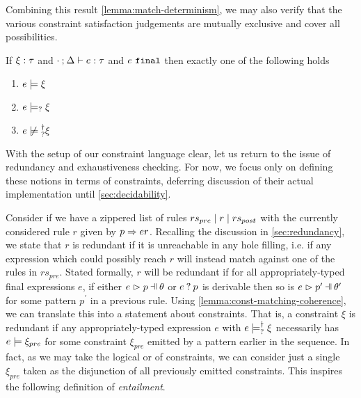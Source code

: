Combining this result \autoref{lemma:match-determinism}, we may also verify that the various constraint satisfaction judgements are mutually exclusive and cover all possibilities.

\begin{theorem}
	\label{theorem:exclusive-constraint-satisfaction}
	If $\xi : \tau$ and $\cdot \mathbin{;} \Delta \vdash e : \tau$ and $e ~\mathtt{final}$ then exactly one of the following holds
	\begin{enumerate}
		\item $e \models \xi$
		\item $e \models_{?} \xi$
		\item $\cnotsatisfyormay{e}{\xi}$
	\end{enumerate}
\end{theorem}

With the setup of our constraint language clear, let us return to the issue of redundancy and exhaustiveness checking. For now, we focus only on defining these notions in terms of constraints, deferring discussion of their actual implementation until \autoref{sec:decidability}.

Consider if we have a zippered list of rules $rs_{pre} \mid r \mid rs_{post}$ with the currently considered rule $r$ given by $p \Rightarrow er$. Recalling the discussion in \autoref{sec:redundancy}, we state that $r$ is redundant if it is unreachable in any hole filling, i.e. if any expression which could possibly reach $r$ will instead match against one of the rules in $rs_{pre}$. Stated formally, $r$ will be redundant if for all appropriately-typed final expressions $e$, if either $\hpatmatch{e}{p}{\theta}$ or $e \mathbin{?} p$ is derivable then so is $\hpatmatch{e}{p^\prime}{\theta^\prime}$ for some pattern $p^\prime$ in a previous rule. Using \autoref{lemma:const-matching-coherence}, we can translate this into a statement about constraints. That is, a constraint $\xi$ is redundant if any appropriately-typed expression $e$ with $e \models_{?}^{\dag} \xi$ necessarily has $e \models \xi_{pre}$ for some constraint $\xi_{pre}$ emitted by a pattern earlier in the sequence. In fact, as we may take the logical or of constraints, we can consider just a single $\xi_{pre}$ taken as the disjunction of all previously emitted constraints. This inspires the following definition of \emph{entailment}.

